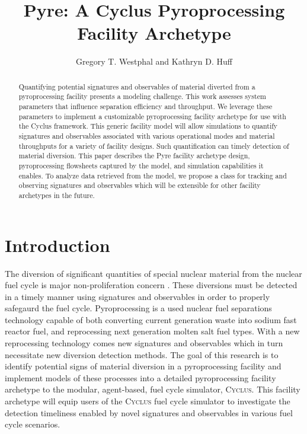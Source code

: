 \documentclass{anstrans}
\title{Pyre: A Cyclus Pyroprocessing Facility Archetype}
\author{Gregory T. Westphal and Kathryn D. Huff}
\institute{
Dept. of Nuclear, Plasma and Radiological Engineering, University of Illinois at Urbana-Champaign \\
gtw2@illinois.edu
}
\newcommand{\Cyclus}{\textsc{Cyclus}\xspace}%
\begin{document}
\begin{abstract}
Quantifying potential signatures and observables of material diverted from a 
pyroprocessing facility presents a modeling challenge.
This work assesses system parameters that influence separation efficiency and 
throughput. We leverage these parameters to implement a customizable pyroprocessing facility archetype for use with the Cyclus framework.
This generic facility model will allow simulations to 
quantify signatures and observables associated with various operational modes 
and material throughputs for a variety of facility designs. Such quantification 
can timely detection of material diversion. 
This paper describes the Pyre facility archetype design, pyroprocessing flowsheets captured by the model, and simulation capabilities it enables. 
To analyze data retrieved from the model, we propose a class for tracking and 
observing signatures and observables which will be extensible for other 
facility archetypes in the future.
\end{abstract}
\section{Introduction}
The diversion of significant quantities of special nuclear material from the nuclear fuel cycle is major non-proliferation 
concern \cite{noauthor_iaea_2017}. These diversions must be detected in a timely manner using signatures and observables in 
order to properly safegaurd the fuel cycle. Pyroprocessing is a used nuclear fuel separations technology capable of both 
converting current generation waste into sodium fast reactor fuel, and reprocessing next generation molten salt fuel types. 
With a new reprocessing technology comes new signatures and observables which in turn necessitate new diversion detection methods. 
The goal of this research is to identify potential signs of material diversion in a pyroprocessing facility and implement models 
of these processes into a detailed pyroprocessing facility archetype to the modular, agent-based, fuel cycle simulator, \Cyclus \cite{huff_fundamental_2016}. This facility archetype will equip users of the \Cyclus fuel cycle simulator to investigate the 
detection timeliness enabled by novel signatures and observables in various fuel cycle scenarios.
\end{document}
